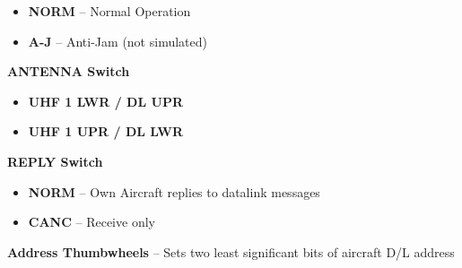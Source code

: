 \begin{tableitemize}
{\begin{subitemize}
\begin{itemize}
            \item \textbf{NORM} -- Normal Operation
            \item \textbf{A-J} -- Anti-Jam (not simulated)
        \end{itemize}
        \item \textbf{ANTENNA Switch}
        \begin{itemize}
            \item \textbf{UHF 1 LWR / DL UPR}
            \item \textbf{UHF 1 UPR / DL LWR}
        \end{itemize}
        \item \textbf{REPLY Switch}
        \begin{itemize}
            \item \textbf{NORM} -- Own Aircraft replies to datalink messages
            \item\textbf{CANC} -- Receive only
        \end{itemize}
        \item \textbf{Address Thumbwheels} -- Sets two least significant bits of aircraft D/L address
    \end{subitemize}}
\end{tableitemize}


\clearpage

